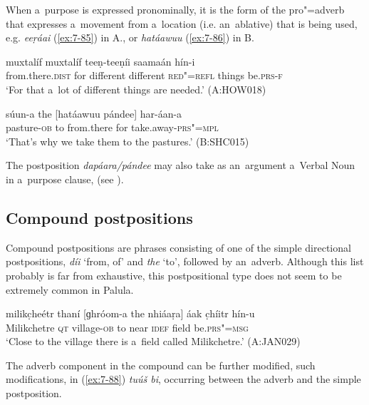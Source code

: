 When a~purpose is expressed pronominally, it is the form of the pro"=adverb that expresses a~movement from a~location (i.e. an~ablative) that is being used, e.g. \textit{eeṛáai} (\ref{ex:7-85}) in A., or \textit{hatáawuu} (\ref{ex:7-86}) in B.

\begin{exe}
\ex
\label{ex:7-85}
 muxtalíf muxtalíf teeṇ-teeṇíi saamaán hín-i \\
from.there.\textsc{dist} for different different \textsc{red"=refl}  things be.\textsc{prs-f}  \\
\glt `For that a~lot of different things are needed.' (A:HOW018)
\end{exe}
\begin{exe}
\ex
\label{ex:7-86}
\gll súun-a the [hatáawuu pándee] har-áan-a \\
pasture-\textsc{ob} to from.there for take.away-\textsc{prs"=mpl} \\
\glt `That's why we take them to the pastures.' (B:SHC015)
\end{exe}

The postposition \textit{dapáara/pándee} may also take as an~argument a~Verbal Noun in a~purpose clause, (see ).


\subsection{Compound postpositions}
\label{subsec:7-2-3}

Compound postpositions are phrases consisting of one of the simple directional postpositions, \textit{díi} `from, of' and \textit{the} `to', followed by an~adverb. Although this list probably is far from exhaustive, this postpositional type does not seem to be extremely common in Palula. 


\begin{exe}
\ex
\label{ex:7-87}
\gll milikc̣heétr thaní [ɡhróom-a the nhiáaṛa] áak c̣híitr hín-u \\
Milikchetre \textsc{qt} village-\textsc{ob} to near \textsc{idef} field be.\textsc{prs"=msg} \\
\glt `Close to the village there is a~field called Milikchetre.' (A:JAN029)
\end{exe}

The adverb component in the compound can be further modified, such modifications, in (\ref{ex:7-88}) \textit{tuúš bi}, occurring between the adverb and the simple postposition.

